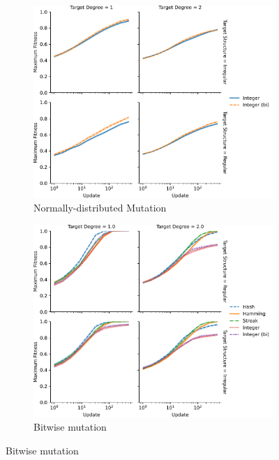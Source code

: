 \begin{figure}[!htbp]
\begin{minipage}{6in}
\begin{center}

\begin{minipage}{0.5\linewidth}
\begin{subfigure}[b]{\linewidth}
\includegraphics[width=\linewidth]{img/target_evolve_norm/viz=max-fitness-line+_data_hathash_hash=3e06b14c923ee265+_script_fullcat_hash=c26c8688c31571c2+ext=}
\caption{Normally-distributed Mutation} \label{fig:norm_dist_mut}
\end{subfigure}
\end{minipage}%
\begin{minipage}{0.5\linewidth}
\begin{subfigure}[b]{\linewidth}
\includegraphics[width=\linewidth]{img/target_evolve/viz=max-fitness-line+_data_hathash_hash=4c78832f20b46ffd+_script_fullcat_hash=c26c8688c31571c2+ext=}
\caption{Bitwise mutation} \label{fig:bitwise_mut}
\end{subfigure}
\end{minipage}


\end{center}
\end{minipage}
\end{figure}
